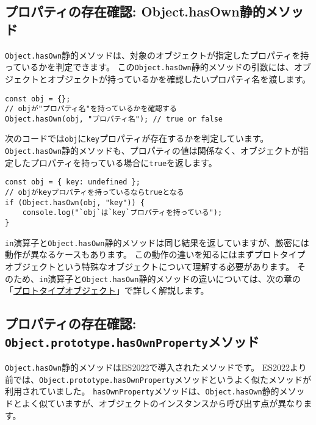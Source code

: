 \hypertarget{object-hasown-method}{%
\subsection[プロパティの存在確認: \texttt{Object.hasOwn}静的メソッド]{プロパティの存在確認: Object.hasOwn静的メソッド\,\protect{}}\label{object-hasown-method}}

\texttt{Object.hasOwn}静的メソッドは、対象のオブジェクトが指定したプロパティを持っているかを判定できます。
この\texttt{Object.hasOwn}静的メソッドの引数には、オブジェクトとオブジェクトが持っているかを確認したいプロパティ名を渡します。

\begin{lstlisting}
const obj = {};
// objが"プロパティ名"を持っているかを確認する
Object.hasOwn(obj, "プロパティ名"); // true or false
\end{lstlisting}

次のコードでは\texttt{obj}に\texttt{key}プロパティが存在するかを判定しています。
\texttt{Object.hasOwn}静的メソッドも、プロパティの値は関係なく、オブジェクトが指定したプロパティを持っている場合に\texttt{true}を返します。

\begin{lstlisting}
const obj = { key: undefined };
// objがkeyプロパティを持っているならtrueとなる
if (Object.hasOwn(obj, "key")) {
    console.log("`obj`は`key`プロパティを持っている");
}
\end{lstlisting}

\texttt{in}演算子と\texttt{Object.hasOwn}静的メソッドは同じ結果を返していますが、厳密には動作が異なるケースもあります。
この動作の違いを知るにはまずプロトタイプオブジェクトという特殊なオブジェクトについて理解する必要があります。
そのため、\texttt{in}演算子と\texttt{Object.hasOwn}静的メソッドの違いについては、次の章の「\hyperlink{prototype-object}{プロトタイプオブジェクト}」で詳しく解説します。

\hypertarget{hasOwnProperty-method}{%
\subsection{プロパティの存在確認: \texttt{Object.prototype.hasOwnProperty}メソッド}\label{hasOwnProperty-method}}

\texttt{Object.hasOwn}静的メソッドはES2022で導入されたメソッドです。
ES2022より前では、\texttt{Object.prototype.hasOwnProperty}メソッドというよく似たメソッドが利用されていました。
\texttt{hasOwnProperty}メソッドは、\texttt{Object.hasOwn}静的メソッドとよく似ていますが、オブジェクトのインスタンスから呼び出す点が異なります。

